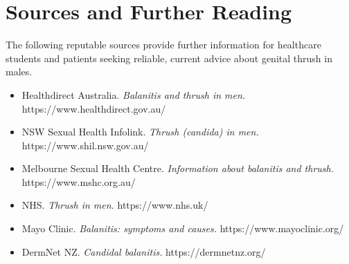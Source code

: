 \section*{Sources and Further Reading}
The following reputable sources provide further information for healthcare students and patients seeking reliable, current advice about genital thrush in males.

\begin{itemize}
    \item Healthdirect Australia. \textit{Balanitis and thrush in men.} https://www.healthdirect.gov.au/
    \item NSW Sexual Health Infolink. \textit{Thrush (candida) in men.} https://www.shil.nsw.gov.au/
    \item Melbourne Sexual Health Centre. \textit{Information about balanitis and thrush.} https://www.mshc.org.au/
    \item NHS. \textit{Thrush in men.} https://www.nhs.uk/
    \item Mayo Clinic. \textit{Balanitis: symptoms and causes.} https://www.mayoclinic.org/
    \item DermNet NZ. \textit{Candidal balanitis.} https://dermnetnz.org/
\end{itemize}
